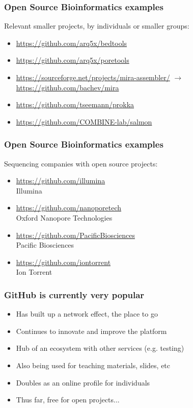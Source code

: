 \begin{frame}
  \frametitle{Open Source Bioinformatics examples}
  Relevant smaller projects, by individuals or smaller groups:
  \begin{itemize}
    \item \url{https://github.com/arq5x/bedtools}
    \item \url{https://github.com/arq5x/poretools}
    \item \url{https://sourceforge.net/projects/mira-assembler/} $\rightarrow$ \url{https://github.com/bachev/mira}
    \item \url{https://github.com/tseemann/prokka}
    \item \url{https://github.com/COMBINE-lab/salmon}
  \end{itemize}
\end{frame}

\begin{frame}
  \frametitle{Open Source Bioinformatics examples}
  Sequencing companies with open source projects:
  \begin{itemize}
    \item \url{https://github.com/illumina} \\ Illumina
    \item \url{https://github.com/nanoporetech} \\ Oxford Nanopore Technologies
    \item \url{https://github.com/PacificBiosciences} \\ Pacific Biosciences
    \item \url{https://github.com/iontorrent} \\ Ion Torrent
  \end{itemize}
\end{frame}

\begin{frame}
  \frametitle{GitHub is currently very popular}
  \begin{itemize}
    \item Has built up a network effect, the place to go
    \item Continues to innovate and improve the platform
    \item Hub of an ecosystem with other services (e.g. testing)
    \item Also being used for teaching materials, slides, etc
    \item Doubles as an online profile for individuals
    \item Thus far, free for open projects...
  \end{itemize}
\end{frame}

